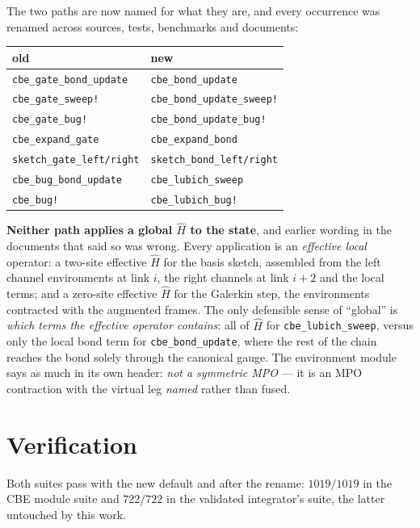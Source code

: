 \documentclass[11pt,a4paper]{article}
\newcommand{\Hb}{\hat{H}}
\newcommand{\code}[1]{\texttt{\small #1}}
\begin{document}
The two paths are now named for what they are, and every occurrence was renamed across sources,
tests, benchmarks and documents:

\begin{center}
\begin{tabular}{@{}ll@{}}
\toprule
old & new \\
\midrule
\code{cbe\_gate\_bond\_update} & \code{cbe\_bond\_update} \\
\code{cbe\_gate\_sweep!} & \code{cbe\_bond\_update\_sweep!} \\
\code{cbe\_gate\_bug!} & \code{cbe\_bond\_update\_bug!} \\
\code{cbe\_expand\_gate} & \code{cbe\_expand\_bond} \\
\code{sketch\_gate\_left/right} & \code{sketch\_bond\_left/right} \\
\code{cbe\_bug\_bond\_update} & \code{cbe\_lubich\_sweep} \\
\code{cbe\_bug!} & \code{cbe\_lubich\_bug!} \\
\bottomrule
\end{tabular}
\end{center}

\noindent
\textbf{Neither path applies a global $\Hb$ to the state}, and earlier wording in the documents
that said so was wrong. Every application is an \emph{effective local} operator: a two-site
effective $\Hb$ for the basis sketch, assembled from the left channel environments at link $i$,
the right channels at link $i+2$ and the local terms; and a zero-site effective $\Hb$ for the
Galerkin step, the environments contracted with the augmented frames. The only defensible sense
of ``global'' is \emph{which terms the effective operator contains}: all of $\Hb$ for
\code{cbe\_lubich\_sweep}, versus only the local bond term for \code{cbe\_bond\_update}, where
the rest of the chain reaches the bond solely through the canonical gauge. The environment
module says as much in its own header: \emph{not a symmetric MPO} --- it is an MPO contraction
with the virtual leg \emph{named} rather than fused.

\section{Verification}

Both suites pass with the new default and after the rename: $1019/1019$ in the CBE module suite
and $722/722$ in the validated integrator's suite, the latter untouched by this work.
\end{document}
